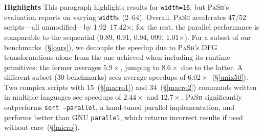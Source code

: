 \documentclass[sigplan, review, screen, anonymous]{acmart}
\newcommand{\heading}[1]{\vspace{4pt}\noindent\textbf{#1}\enspace}
\newcommand{\ttt}[1]{\texttt{#1}}
\newcommand{\kk}[1]{[{\color{magenta}kk: #1}]}
\newcommand{\sx}[1]{(\S\ref{#1})}
\newcommand{\sys}{{\scshape PaSh}\xspace}
\begin{document}

\heading{Highlights}
This paragraph highlights results for \ttt{width=16}, but \sys's evaluation reports on varying \ttt{width}s (2--64).
Overall, \sys accelerates 47/52 scripts---all unmodified---by 1.92--17.42$\times$; 
  for the rest, the parallel performance is comparable to the sequential (0.89, 0.91, 0.94, 099, 1.01$\times$).
For a subset of our benchmarks~\sx{ours}, we decouple the speedup due to \sys's DFG transformations alone from the one achieved when including its runtime primitives:
  the former averages $5.9\times$, jumping to $8.6\times$ due to the latter.
A different subset ($30$ benchmarks) sees average speedups of $6.02\times$~\sx{unix50}.
Two complex scripts with 15~\sx{macro1} and 34~\sx{macro2} commands written in multiple languages see speedups of $2.44\times$ and $12.7\times$.
\sys significantly outperforms \ttt{sort --parallel}, a hand-tuned parallel implementation, and performs better than GNU \ttt{parallel}, which returns incorrect results if used without care~\sx{micro}.
\end{document}
